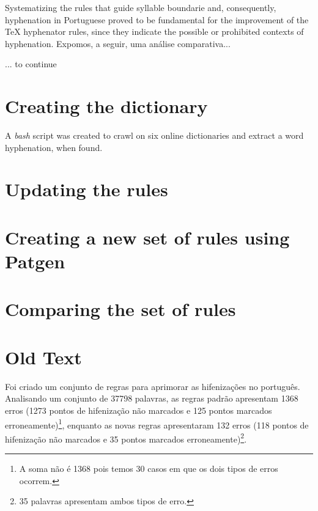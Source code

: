 \documentclass{article}
\begin{document}
Systematizing the rules that guide syllable boundarie and, consequently,
hyphenation in Portuguese proved to be fundamental for the improvement of the
\TeX{} hyphenator rules, since they indicate the possible or prohibited contexts
of hyphenation. Expomos, a seguir, uma análise comparativa...

... to continue
\vspace{10ex}



\section{Creating the dictionary}
A \emph{bash} script was created to crawl on six online dictionaries and extract a word hyphenation, when found. 



\section{Updating the rules}


\section{Creating a new set of rules using Patgen}


\section{Comparing the set of rules}


\section{Old Text}


Foi criado um conjunto de \NumberOfNewRules{} regras para aprimorar as hifenizações no
português. Analisando um conjunto de 37798 palavras, as regras padrão apresentam
1368 erros (1273 pontos de hifenização não marcados e 125 pontos marcados
erroneamente)\footnote{A soma não é 1368 pois temos 30 casos em que os dois
tipos de erros ocorrem.}, enquanto as novas regras apresentaram 132 erros (118
pontos de hifenização não marcados e 35 pontos marcados
erroneamente)\footnote{35 palavras apresentam ambos tipos de erro.}.
\end{document}
